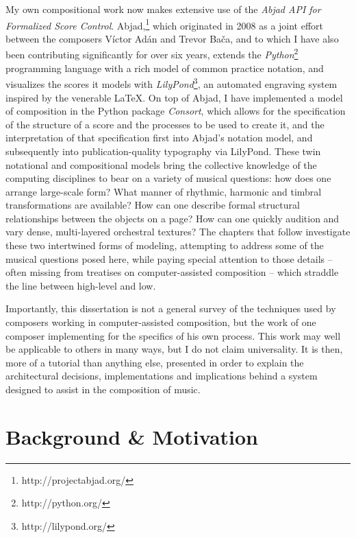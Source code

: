 My own compositional work now makes extensive use of the \emph{Abjad API for
Formalized Score Control}.\citep{baca2011xi, baca2015tenor,
trevino2013compositional} Abjad,\footnote{http://projectabjad.org/} which
originated in 2008 as a joint effort between the composers V\'{i}ctor Ad\'{a}n
and Trevor Ba\v{c}a, and to which I have also been contributing significantly
for over six years, extends the
\emph{Python}\citep{vanrossum2003ys}\footnote{http://python.org/} programming
language with a rich model of common practice notation, and visualizes the
scores it models with
\emph{LilyPond}\citep{nienhuys2003ve}\footnote{http://lilypond.org/}, an
automated engraving system inspired by the venerable \LaTeX{}. On top of Abjad,
I have implemented a model of composition in the Python package \emph{Consort},
which allows for the specification of the structure of a score and the
processes to be used to create it, and the interpretation of that specification
first into Abjad's notation model, and subsequently into publication-quality
typography via LilyPond. These twin notational and compositional models bring
the collective knowledge of the computing disciplines to bear on a
variety of musical questions: how does one arrange large-scale form? What
manner of rhythmic, harmonic and timbral transformations are available? How can
one describe formal structural relationships between the objects on a page? How
can one quickly audition and vary dense, multi-layered orchestral textures? The
chapters that follow investigate these two intertwined forms of modeling,
attempting to address some of the musical questions posed here, while paying
special attention to those details -- often missing from treatises on
computer-assisted composition -- which straddle the line between high-level and
low.

Importantly, this dissertation is not a general survey of the techniques used
by composers working in computer-assisted composition, but the work of one
composer implementing for the specifics of his own process. This work may well
be applicable to others in many ways, but I do not claim universality. It is
then, more of a tutorial than anything else, presented in order to explain the
architectural decisions, implementations and implications behind a system
designed to assist in the composition of music.

\section{Background \& Motivation}
\label{sec:background-and-motivation}

